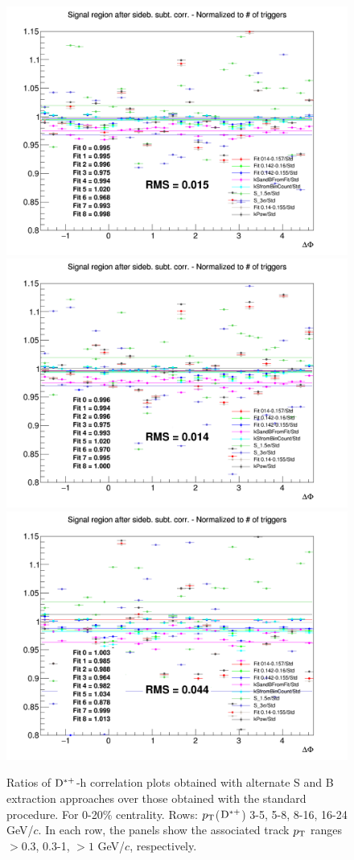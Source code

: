 \begin{figure}
{\includegraphics[width=0.31\linewidth]{figuresVsCent/Dstar/SystSandB/020_SandB_Syst/Ratio_AzimCorrDistr_Dstar_Canvas_PtIntBins10to10_PoolInt_thr03to99_YIELD_020.png}}
{\includegraphics[width=0.31\linewidth]{figuresVsCent/Dstar/SystSandB/020_SandB_Syst/Ratio_AzimCorrDistr_Dstar_Canvas_PtIntBins10to10_PoolInt_thr03to1_YIELD_020.png}}
{\includegraphics[width=0.31\linewidth]{figuresVsCent/Dstar/SystSandB/020_SandB_Syst/Ratio_AzimCorrDistr_Dstar_Canvas_PtIntBins10to10_PoolInt_thr1to99_YIELD_020.png}} \\
 \caption{Ratios of ${\rm D^{*+}}$-h correlation plots obtained with alternate S and B extraction approaches over those obtained with the standard procedure. For 0-20\% centrality. Rows: $p_{\rm T}$(${\rm D^{*+}}$) 3-5, 5-8, 8-16, 16-24 GeV/$c$. In each row, the panels show the associated track
$p_{\rm T}$ ranges $> 0.3$, 0.3-1, $> 1$ GeV/$c$, respectively.}
\label{fig:SysSandB020Dstar}
\end{figure}


